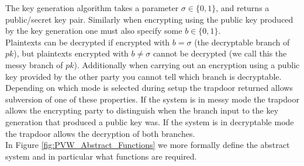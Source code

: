 \documentclass[ %
                    author={Nicholas Tutte},
                supervisor={Prof. Nigel Smart},
                    degree={MEng},
                     title={Secure Two Party Computation},
                  subtitle={A practical comparison of recent protocols},
                      type={Research - GG1K},
                      year={2015} ]{dissertation}
\begin{document}
					The key generation algorithm takes a parameter $\sigma \in \{0, 1\}$, and returns a public/secret key pair. Similarly when encrypting using the public key produced by the key generation one must also specify some $b \in \{0, 1\}$.\\

					Plaintexts can be decrypted if encrypted with $b = \sigma$ (the decryptable branch of $pk$), but plaintexts encrypted with $b \neq \sigma$ cannot be decrypted (we call this the messy branch of $pk$). Additionally when carrying out an encryption using a public key provided by the other party you cannot tell which branch is decryptable.\\

					Depending on which mode is selected during setup the trapdoor returned allows subversion of one of these properties. If the system is in messy mode the trapdoor allows the encrypting party to distinguish when the branch input to the key generation that produced a public key was. If the system is in decryptable mode the trapdoor allows the decryption of both branches.\\

					In Figure \ref{fig:PVW_Abstract_Functions} we more formally define the abstract system and in particular what functions are required.
\end{document}
